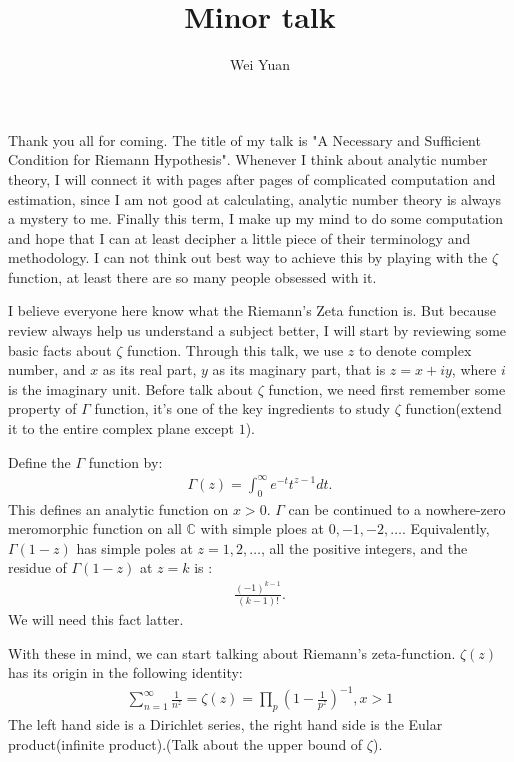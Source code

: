 \documentclass[11pt]{amsart}
\title{Minor talk}
\author{Wei Yuan}
\begin{document}
\maketitle

Thank you all for coming. The title of my talk is "A Necessary and Sufficient Condition for 
Riemann Hypothesis".  Whenever I think about analytic number theory, I will connect it with pages 
after pages of complicated computation and estimation, since I am not good at calculating, 
analytic number theory is always a mystery to me. Finally this term, I make up my mind to do some 
computation and hope that I can at least decipher a little piece of their terminology and methodology. 
I can not think out best way to achieve this by playing with the $\zeta$ function, at least there are 
so many people obsessed with it. 

I believe everyone here know what the Riemann's Zeta function is. But because review always help 
us understand a subject better, I will start by reviewing some basic facts about $\zeta$ function. Through
this talk, we use $z$ to denote complex number, and $x$ as its real part, $y$ as its maginary part, that is
$z = x + iy$, where $i$ is the  imaginary unit. Before talk about $\zeta$ function, we need first remember 
some property of $\Gamma$ function, it's one of the key ingredients to study $\zeta$ function(extend it
to the entire complex plane except $1$). 

Define the $\Gamma$ function by:
\begin{align*}
\Gamma(z) = \int^{\infty}_{0} e^{-t} t^{z-1} dt.
\end{align*}
This defines an analytic function on $x > 0$. $\Gamma$ can be continued to a nowhere-zero meromorphic
function on all $\mathbb{C}$ with simple ploes at $0, -1, -2, \ldots$. Equivalently, $\Gamma(1-z)$ has simple
poles at $z= 1, 2, \ldots$, all the positive integers, and the residue of $\Gamma(1-z)$ at $z = k$ is :
\begin{align*}
\frac{(-1)^{k-1}}{(k-1)!}.
\end{align*}
We will need this fact latter.

With these in mind, we can start talking about Riemann's zeta-function. $\zeta(z)$ has its origin in the following 
identity:
\begin{align*}
\sum^{\infty}_{n=1} \frac{1}{n^z} = \zeta(z) = \prod_{p} (1 - \frac{1}{p^z})^{-1}, x > 1
\end{align*}
The left hand side is a  Dirichlet series, the right hand side is the Eular product(infinite product).(Talk about the upper
bound of $\zeta$).
\end{document}
